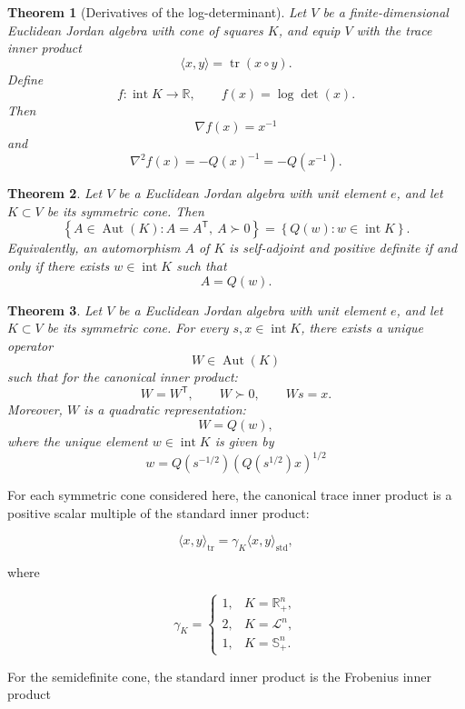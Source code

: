 \documentclass[a4paper,11pt]{book}
\theoremstyle{plain}
\newtheorem{theorem}{Theorem}[chapter]
\theoremstyle{definition}
\theoremstyle{remark}
\numberwithin{equation}{chapter}
\numberwithin{algorithm}{chapter}
\begin{document}
	
	\begin{theorem}[Derivatives of the log-determinant]
		Let $V$ be a finite-dimensional Euclidean Jordan algebra with cone of squares
		$K$, and equip $V$ with the trace inner product
		\[
		\langle x,y\rangle=\operatorname{tr}(x\circ y).
		\]
		Define
		\[
		f:\operatorname{int}K\to\mathbb{R},
		\qquad
		f(x)=\log\det(x).
		\]
		Then
		\[
		\nabla f(x)=x^{-1}
		\]
		and
		\[
		\nabla^2 f(x)=-Q(x)^{-1}=-Q(x^{-1}).
		\]
		
	\end{theorem}
	
	\begin{theorem}
		Let \(V\) be a Euclidean Jordan algebra with unit element \(e\), and let
		\(K\subset V\) be its symmetric cone. Then
		\[
		\left\{
		A\in\operatorname{Aut}(K):
		A=A^{\mathsf T},\ A\succ0
		\right\}
		=
		\left\{
		Q(w):w\in\operatorname{int}K
		\right\}.
		\]
		Equivalently, an automorphism \(A\) of \(K\) is self-adjoint and positive
		definite if and only if there exists \(w\in\operatorname{int}K\) such that
		\[
		A=Q(w).
		\]
	\end{theorem}
	\begin{theorem}
		Let \(V\) be a Euclidean Jordan algebra with unit element \(e\), and let
		\(K\subset V\) be its symmetric cone. For every
		\(s,x\in\operatorname{int}K\), there exists a unique operator
		\[
		W\in\operatorname{Aut}(K)
		\]
		such that for the canonical inner product:
		\[
		W=W^{\mathsf T},\qquad W\succ0,\qquad Ws=x.
		\]
		Moreover, \(W\) is a quadratic representation:
		\[
		W=Q(w),
		\]
		where the unique element \(w\in\operatorname{int}K\) is given by
		\[
		w=
		Q\!\left(s^{-1/2}\right)
		\left(Q\!\left(s^{1/2}\right)x\right)^{1/2}
		\]
		
	\end{theorem}
	
	For each symmetric cone considered here, the canonical trace inner product is a positive scalar multiple of the standard inner product:
	
	$$
	\langle x,y\rangle_{\mathrm{tr}}
	=
	\gamma_K\langle x,y\rangle_{\mathrm{std}},
	$$
	
	where
	
	$$
	\gamma_K=
	\begin{cases}
		1, & K=\mathbb R_+^n,\\
		2, & K=\mathcal L^n,\\
		1, & K=\mathbb S_+^n.
	\end{cases}
	$$
	
	For the semidefinite cone, the standard inner product is the Frobenius inner product
	
\end{document}
